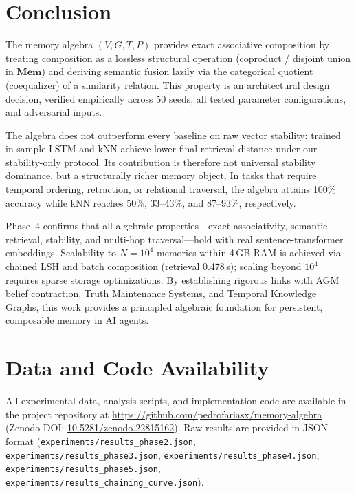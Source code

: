 \documentclass[11pt,a4paper]{article}
\theoremstyle{definition}
\begin{document}
\section{Conclusion}\label{sec:conclusion}

The memory algebra $(V, G, T, P)$ provides exact associative composition by treating composition as a lossless structural operation (coproduct / disjoint union in $\mathbf{Mem}$) and deriving semantic fusion lazily via the categorical quotient (coequalizer) of a similarity relation. This property is an architectural design decision, verified empirically across 50 seeds, all tested parameter configurations, and adversarial inputs.

The algebra does not outperform every baseline on raw vector stability: trained in-sample LSTM and kNN achieve lower final retrieval distance under our stability-only protocol. Its contribution is therefore not universal stability dominance, but a structurally richer memory object. In tasks that require temporal ordering, retraction, or relational traversal, the algebra attains 100\% accuracy while kNN reaches 50\%, 33--43\%, and 87--93\%, respectively.

Phase~4 confirms that all algebraic properties---exact associativity, semantic retrieval, stability, and multi-hop traversal---hold with real sentence-transformer embeddings. Scalability to $N = 10^4$ memories within 4\,GB RAM is achieved via chained LSH and batch composition (retrieval 0.478\,s); scaling beyond $10^4$ requires sparse storage optimizations. By establishing rigorous links with AGM belief contraction, Truth Maintenance Systems, and Temporal Knowledge Graphs, this work provides a principled algebraic foundation for persistent, composable memory in AI agents.

\section*{Data and Code Availability}

All experimental data, analysis scripts, and implementation code are available in the project repository at \url{https://github.com/pedrofariasx/memory-algebra} (Zenodo DOI: \href{https://doi.org/10.5281/zenodo.22815162}{10.5281/zenodo.22815162}). Raw results are provided in JSON format (\texttt{experiments/results\_phase2.json}, \texttt{experiments/results\_phase3.json}, \texttt{experiments/results\_phase4.json}, \texttt{experiments/results\_phase5.json}, \texttt{experiments/results\_chaining\_curve.json}).
\end{document}
